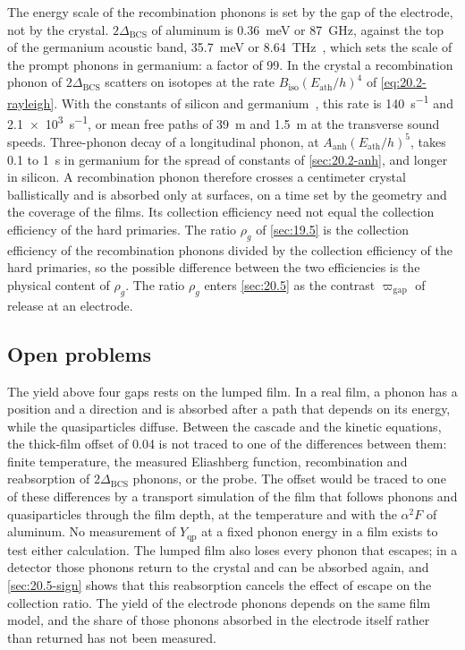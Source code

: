 The energy scale of the recombination phonons is set by the gap of the electrode, not by the crystal. $2\Delta_{\mathrm{BCS}}$ of aluminum is \SI{0.36}{meV} or \SI{87}{GHz}, against the top of the germanium acoustic band, \SI{35.7}{meV} or \SI{8.64}{THz}~\cite[Table~I]{leman2012invited}, which sets the scale of the prompt phonons in germanium: a factor of 99. In the crystal a recombination phonon of $2\Delta_{\mathrm{BCS}}$ scatters on isotopes at the rate $B_{\mathrm{iso}}(E_{\mathrm{ath}}/h)^4$ of \cref{eq:20.2-rayleigh}. With the constants of silicon and germanium~\cite[Table~I]{leman2012invited}, this rate is \SI{140}{s^{-1}} and \SI{2.1e3}{s^{-1}}, or mean free paths of \SI{39}{m} and \SI{1.5}{m} at the transverse sound speeds. Three-phonon decay of a longitudinal phonon, at $A_{\mathrm{anh}}(E_{\mathrm{ath}}/h)^5$, takes 0.1 to \SI{1}{s} in germanium for the spread of constants of \cref{sec:20.2-anh}, and longer in silicon. A recombination phonon therefore crosses a centimeter crystal ballistically and is absorbed only at surfaces, on a time set by the geometry and the coverage of the films. Its collection efficiency need not equal the collection efficiency of the hard primaries. The ratio $\rho_g$ of \cref{sec:19.5} is the collection efficiency of the recombination phonons divided by the collection efficiency of the hard primaries, so the possible difference between the two efficiencies is the physical content of $\rho_g$. The ratio $\rho_g$ enters \cref{sec:20.5} as the contrast $\varpi_{\mathrm{gap}}$ of release at an electrode.

\subsection{Open problems}\label{sec:20.4-open}

The yield above four gaps rests on the lumped film. In a real film, a phonon has a position and a direction and is absorbed after a path that depends on its energy, while the quasiparticles diffuse. Between the cascade and the kinetic equations, the thick-film offset of 0.04 is not traced to one of the differences between them: finite temperature, the measured Eliashberg function, recombination and reabsorption of $2\Delta_{\mathrm{BCS}}$ phonons, or the probe. The offset would be traced to one of these differences by a transport simulation of the film that follows phonons and quasiparticles through the film depth, at the temperature and with the $\alpha^2F$ of aluminum. No measurement of $Y_{\mathrm{qp}}$ at a fixed phonon energy in a film exists to test either calculation. The lumped film also loses every phonon that escapes; in a detector those phonons return to the crystal and can be absorbed again, and \cref{sec:20.5-sign} shows that this reabsorption cancels the effect of escape on the collection ratio. The yield of the electrode phonons depends on the same film model, and the share of those phonons absorbed in the electrode itself rather than returned has not been measured.
